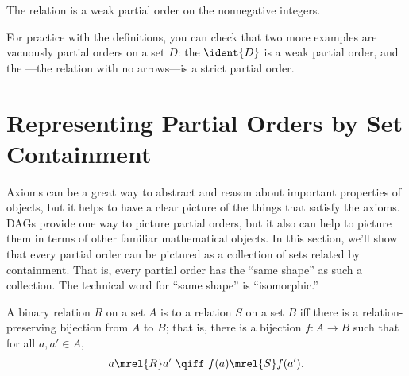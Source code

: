 \iffalse
For integers, $m,n$ we write $m \divides n$ to mean that $m$
\emph{divides} $n$, namely, there is an integer $k$ such that $n=km$.
\fi

\begin{example}\label{divides}
The  relation is a weak partial order on the nonnegative integers.
\end{example}

For practice with the definitions, you can check that two more
examples are vacuously partial orders on a set $D$: the  $\ident{D}$ is a weak partial order, and the ---the relation with no arrows---is a strict partial order.

\begin{problems}

\examproblems
{}

\homeworkproblems
{}

\classproblems
{}

\end{problems}

\section{Representing Partial Orders by Set Containment}\label{poset-as-sets_sec}

Axioms can be a great way to abstract and reason about important
properties of objects, but it helps to have a clear picture of the
things that satisfy the axioms.  DAGs provide one way to picture
partial orders, but it also can help to picture them in terms of other
familiar mathematical objects.  In this section, we'll show that every
partial order can be pictured as a collection of sets related by
containment.  That is, every partial order has the ``same shape'' as
such a collection.  The technical word for ``same shape'' is
``isomorphic.''

\begin{definition}\label{relation-isomorphism}
  A binary relation $R$ on a set $A$ is
   to a relation $S$ on a set $B$ iff there is a
  relation-preserving bijection from $A$ to $B$; that is, there is
  a bijection $f:A \to B$ such that for all $a,a' \in A$,
  \[
  a \mrel{R} a'\ \qiff\ f(a) \mrel{S} f(a').
  \]
\end{definition}

